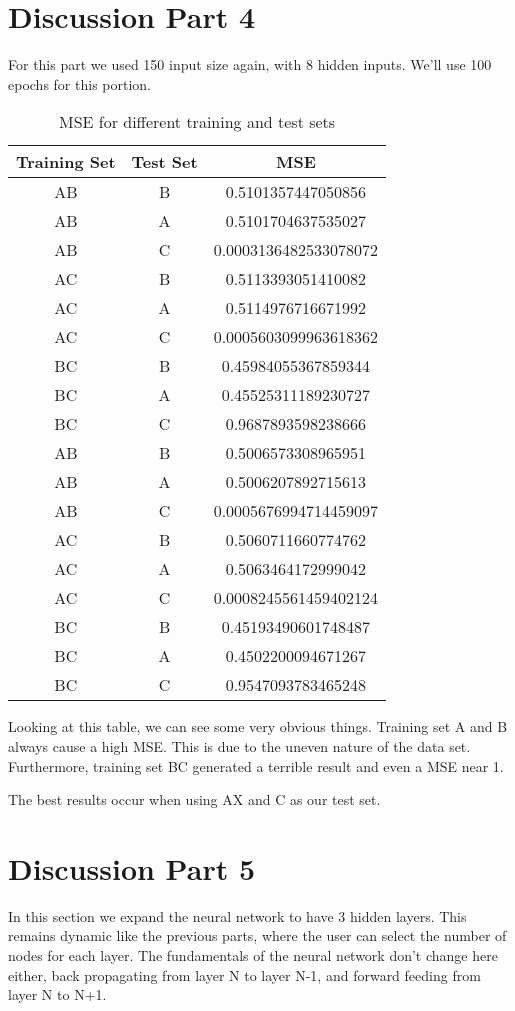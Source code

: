 \documentclass[12pt]{article}
\begin{document}
\section{Discussion Part 4}
For this part we used 150 input size again, with 8 hidden inputs. We'll use 100 epochs for this portion. 

\begin{table}[htbp!]
\centering
\caption{MSE for different training and test sets}
\label{tab:mse}
\begin{tabular}{|c|c|c|}
\hline
\textbf{Training Set} & \textbf{Test Set} & \textbf{MSE} \\ \hline
AB & B & 0.5101357447050856 \\ 
AB & A & 0.5101704637535027 \\ 
AB & C & 0.0003136482533078072 \\ \hline
AC & B & 0.5113393051410082 \\ 
AC & A & 0.5114976716671992 \\ 
AC & C & 0.0005603099963618362 \\ \hline
BC & B & 0.45984055367859344 \\ 
BC & A & 0.45525311189230727 \\ 
BC & C & 0.9687893598238666 \\ \hline
AB & B & 0.5006573308965951 \\ 
AB & A & 0.5006207892715613 \\ 
AB & C & 0.0005676994714459097 \\ \hline
AC & B & 0.5060711660774762 \\ 
AC & A & 0.5063464172999042 \\ 
AC & C & 0.0008245561459402124 \\ \hline
BC & B & 0.45193490601748487 \\ 
BC & A & 0.4502200094671267 \\ 
BC & C & 0.9547093783465248 \\ \hline
\end{tabular}
\end{table}

Looking at this table, we can see some very obvious things. Training set A and B always cause a high MSE. This is due to the uneven nature of the data set.  Furthermore, training set BC generated a terrible result and even a MSE near 1. 

The best results occur when using AX and C as our test set.

\section{Discussion Part 5}
In this section we expand the neural network to have 3 hidden layers. This remains dynamic like the previous parts, where the user can select the number of nodes for each layer. The fundamentals of the neural network don't change here either, back propagating from layer N to layer N-1, and forward feeding from layer N to N+1.
\end{document}
